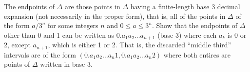 \begin{exercise}{23}
    The endpoints of $\Delta$ are those points in $\Delta$ having a finite-length base 3 decimal expansion (not necessarily in the proper form), that is, all of the points in $\Delta$ of the form $a/3^n$ for some integers $n$ and $0 \leq a \leq 3^n$.
    Show that the endpoints of $\Delta$ other than 0 and 1 can be written as $0.a_1 a_2 \ldots a_{n+1}$ (base 3) where each $a_k$ is 0 or 2, except $a_{n+1}$, which is either 1 or 2.
    That is, the discarded ``middle third'' intervals are of the form $(0.a_1 a_2 \ldots a_n 1, 0.a_1 a_2 \ldots a_n 2)$ where both entires are points of $\Delta$ written in base 3.
\end{exercise}

\begin{solution}
    

\end{solution}
